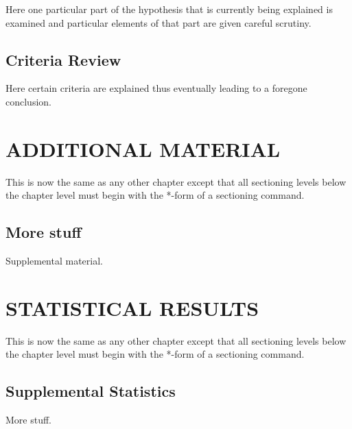 \documentclass[11pt]{isuthesis}
\begin{document}
Here one particular part of the hypothesis that is 
currently being explained is examined and particular
elements of that part are given careful scrutiny.

\section{Criteria Review}

Here certain criteria are explained thus eventually
leading to a foregone conclusion.


\appendixtitle
\appendix
\chapter{ADDITIONAL MATERIAL}

This is now the same as any other chapter except that
all sectioning levels below the chapter level must begin
with the *-form of a sectioning command.

\section*{More stuff}

Supplemental material.


\chapter{STATISTICAL RESULTS}

This is now the same as any other chapter except that
all sectioning levels below the chapter level must begin
with the *-form of a sectioning command.

\section*{Supplemental Statistics}

More stuff.

%
%
%
%

\renewcommand{\bibname}{\centerline{BIBLIOGRAPHY}}
\unappendixtitle
\newpage
{}
{}

\end{document}
